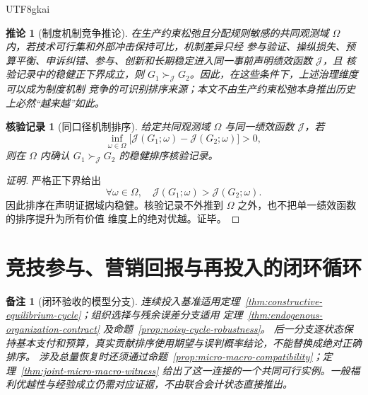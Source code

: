 \documentclass[12pt,a4paper,openany]{report}
\newtheorem{corollary}{推论}[chapter]
\newtheorem{remark}{备注}[chapter]
\newtheorem{Certificate}{核验记录}[chapter]
\begin{document}
\begin{CJK*}{UTF8}{gkai}
\begin{corollary}[制度机制竞争推论]
\label{cor:governance-competition}
在生产约束松弛且分配规则敏感的共同观测域 \(\Omega\) 内，若技术可行集和外部冲击保持可比，机制差异只经
参与验证、操纵损失、预算平衡、申诉纠错、参与、创新和长期稳定进入同一事前声明绩效函数 \(\mathcal J\)，且
核验记录中的稳健正下界成立，则 \(G_1\succ_{\mathcal J}G_2\)。因此，在这些条件下，上述治理维度可以成为制度机制
竞争的可识别排序来源；本文不由生产约束松弛本身推出历史上必然“越来越”如此。
\end{corollary}

\begin{Certificate}[同口径机制排序]
给定共同观测域 \(\Omega\) 与同一绩效函数 \(\mathcal J\)，若
\[
  \inf_{\omega\in\Omega}
  \bigl[\mathcal J(G_1;\omega)-\mathcal J(G_2;\omega)\bigr]>0,
\]
则在 \(\Omega\) 内确认 \(G_1\succ_{\mathcal J}G_2\) 的稳健排序核验记录。
\end{Certificate}

\begin{proof}[证明]
严格正下界给出
\[
  \forall\omega\in\Omega,\quad
  \mathcal J(G_1;\omega)>\mathcal J(G_2;\omega).
\]
因此排序在声明证据域内稳健。核验记录不外推到 \(\Omega\) 之外，也不把单一绩效函数的排序提升为所有价值
维度上的绝对优越。证毕。
\end{proof}

\section{竞技参与、营销回报与再投入的闭环循环}
\label{sec:competition-closed-cycle}

\begin{remark}[闭环验收的模型分支]
连续投入基准适用定理~\ref{thm:constructive-equilibrium-cycle}；组织选择与残余误差分支适用
定理~\ref{thm:endogenous-organization-contract} 及命题~\ref{prop:noisy-cycle-robustness}。
后一分支逐状态保持基本支付和预算，真实贡献排序使用期望与误判概率结论，不能替换成绝对正确排序。
涉及总量恢复时还须通过命题~\ref{prop:micro-macro-compatibility}；定理~\ref{thm:joint-micro-macro-witness}
给出了这一连接的一个共同可行实例。一般福利优越性与经验成立仍需对应证据，不由联合会计状态直接推出。
\end{remark}


\end{CJK*}
\end{document}
